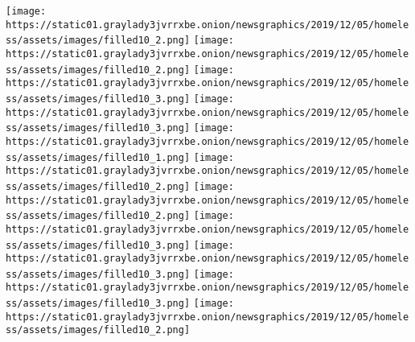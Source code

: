\texttt{[image: https://static01.graylady3jvrrxbe.onion/newsgraphics/2019/12/05/homeless/assets/images/filled10\_2.png]}
\texttt{[image: https://static01.graylady3jvrrxbe.onion/newsgraphics/2019/12/05/homeless/assets/images/filled10\_2.png]}
\texttt{[image: https://static01.graylady3jvrrxbe.onion/newsgraphics/2019/12/05/homeless/assets/images/filled10\_3.png]}
\texttt{[image: https://static01.graylady3jvrrxbe.onion/newsgraphics/2019/12/05/homeless/assets/images/filled10\_3.png]}
\texttt{[image: https://static01.graylady3jvrrxbe.onion/newsgraphics/2019/12/05/homeless/assets/images/filled10\_1.png]}
\texttt{[image: https://static01.graylady3jvrrxbe.onion/newsgraphics/2019/12/05/homeless/assets/images/filled10\_2.png]}
\texttt{[image: https://static01.graylady3jvrrxbe.onion/newsgraphics/2019/12/05/homeless/assets/images/filled10\_2.png]}
\texttt{[image: https://static01.graylady3jvrrxbe.onion/newsgraphics/2019/12/05/homeless/assets/images/filled10\_3.png]}
\texttt{[image: https://static01.graylady3jvrrxbe.onion/newsgraphics/2019/12/05/homeless/assets/images/filled10\_3.png]}
\texttt{[image: https://static01.graylady3jvrrxbe.onion/newsgraphics/2019/12/05/homeless/assets/images/filled10\_3.png]}
\texttt{[image: https://static01.graylady3jvrrxbe.onion/newsgraphics/2019/12/05/homeless/assets/images/filled10\_2.png]}

